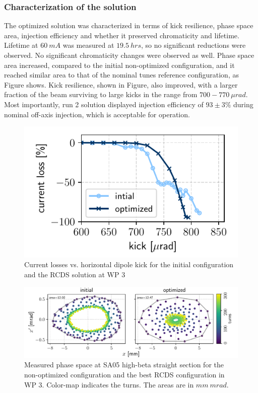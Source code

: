 \subsubsection{Characterization of the solution}
The optimized solution was characterized in terms of kick resilience, phase space area, injection efficiency and whether it preserved chromaticity and lifetime.  Lifetime at $60~\unit{mA}$ was measured at $19.5~\unit{hrs}$, so no significant reductions were observed. No significant chromaticity changes were observed as well. Phase space area increased, compared to the initial non-optimized configuration, and it reached similar area to that of the nominal tunes reference configuration, as Figure shows. Kick resilience, shown in Figure, also improved, with a larger fraction of the beam surviving to large kicks in the range from $700-770~\unit{\mu rad}$. Most importantly, run 2 solution displayed injection efficiency of $93\pm3\%$ during nominal off-axis injection, which is acceptable for operation.
\begin{figure}[tb]
    \centering
    \includegraphics[width=0.7\columnwidth]{Images/wp3_kick_resilience.pdf}
    \caption{Current losses vs. horizontal dipole kick for the initial configuration and the RCDS solution at WP 3}
    \hfill
\end{figure}
\begin{figure}[tb]
    \centering
    \includegraphics[width=\textwidth]{Images/wp3_phase_space.pdf}
    \caption{Measured phase space at SA05 high-beta straight section for the non-optimized configuration and the best RCDS configuration in WP 3. Color-map indicates the turns. The areas are in $\unit{mm}~\unit{mrad}$.}
\end{figure}
